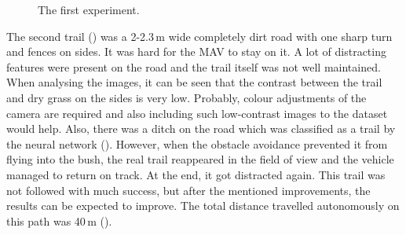 \begin{figure}[!h]

  \centering

  \centering	
  


  \caption{The first experiment.}
  \label{fig:first_trail_photos}
\end{figure}


The second trail () was a 2-2.3\,m wide completely dirt road with one sharp turn and fences on sides. It was hard for the \acs{MAV} to stay on it. A lot of distracting features were present on the road and the trail itself was not well maintained. When analysing the images, it can be seen that the contrast between the trail and dry grass on the sides is very low. Probably, colour adjustments of the camera are required and also including such low-contrast images to the dataset would help. Also, there was a ditch on the road which was classified as a trail by the neural network (). However, when the obstacle avoidance prevented it from flying into the bush, the real trail reappeared in the field of view and the vehicle managed to return on track. At the end, it got distracted again. This trail was not followed with much success, but after the mentioned improvements, the results can be expected to improve. The total distance travelled autonomously on this path was 40\,m ().


